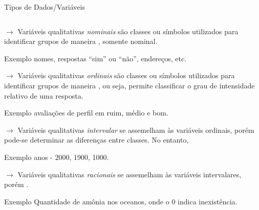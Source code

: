 \documentclass{bredelebeamer}
\begin{document}
\begin{frame}{Tipos de Dados/Variáveis}
\begin{columns}
\begin{column}{0.5\textwidth}
\vspace{0.001cm}

\tiny{
\textbf{$\rightarrow$} Variáveis qualitativas \emph{nominais} são
classes ou símbolos utilizados para identificar grupos de maneira
\textbf{}, somente nominal.

\begin{flushright}
Exemplo nomes, respostas ``sim'' ou ``não'', endereços, etc.
\end{flushright}
}

\vspace{0.001cm}

\tiny{
\textbf{$\rightarrow$} Variáveis qualitativas \emph{ordinais} são
classes ou símbolos utilizados para identificar grupos de maneira
\textbf{}, ou seja, permite classificar o grau
de intensidade relativo de uma resposta.

\begin{flushright}
Exemplo avaliações de perfil em ruim, médio e bom.
\end{flushright}
}

\vspace{0.001cm}

\tiny{
\textbf{$\rightarrow$} Variáveis qualitativas \emph{intervalar} se
assemelham às variáveis ordinais, porém pode-se determinar as diferenças
entre classes. No entanto, \textbf{}

\begin{flushright}
Exemplo anos - 2000, 1900, 1000. 
\end{flushright}
}

\vspace{0.001cm}

\tiny{
\textbf{$\rightarrow$} Variáveis qualitativas \emph{racionais} se
assemelham às variáveis intervalares, porém \textbf{}.

\begin{flushright}
Exemplo Quantidade de amônia nos oceanos, onde o 0 indica inexistência.
\end{flushright}
}

\end{column}
\end{columns}

\end{frame}
\end{document}
